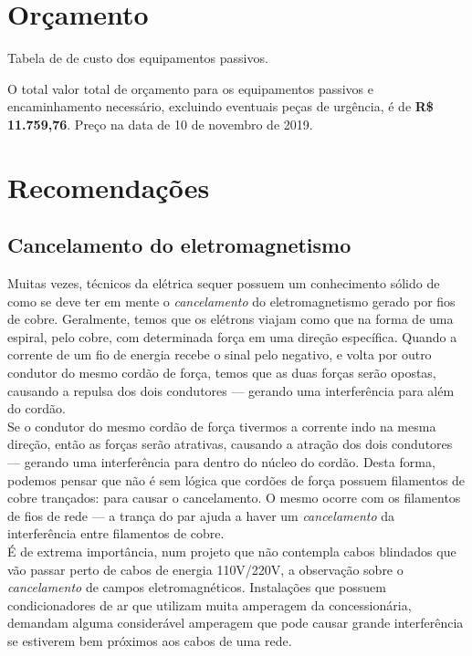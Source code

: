 \documentclass[	DIV=calc,%
							paper=a4,%
							fontsize=12pt,%
							onecolumn]{scrartcl}	 					%
\begin{document}
\pagebreak

\section{Orçamento}
Tabela de de custo dos equipamentos passivos.
\vspace{0.5cm}











O total valor total de orçamento para os equipamentos passivos e encaminhamento necessário, excluindo eventuais peças de urgência, é de \textbf{R\$ 11.759,76}.
Preço na data de 10 de novembro de 2019.

\pagebreak

\section{Recomendações}

\subsection{Cancelamento do eletromagnetismo}

Muitas vezes, técnicos da elétrica sequer possuem um conhecimento sólido de como se deve ter em mente o \textit{cancelamento} do eletromagnetismo gerado por fios de cobre. Geralmente, temos que os elétrons viajam como que na forma de uma espiral, pelo cobre, com determinada força em uma direção específica. Quando a corrente de um fio de energia recebe o sinal pelo negativo, e volta por outro condutor do mesmo cordão de força, temos que as duas forças serão opostas, causando a repulsa dos dois condutores --- gerando uma interferência para além do cordão. 
\\

Se o condutor do mesmo cordão de força tivermos a corrente indo na mesma direção, então as forças serão atrativas, causando a atração dos dois condutores --- gerando uma interferência para dentro do núcleo do cordão. Desta forma, podemos pensar que não é sem lógica que cordões de força possuem filamentos de cobre trançados: para causar o cancelamento. O mesmo ocorre com os filamentos de fios de rede --- a trança do par ajuda a haver um \textit{cancelamento} da interferência entre filamentos de cobre.
\\

É de extrema importância, num projeto que não contempla cabos blindados  que vão passar perto de cabos de energia 110V/220V, a observação sobre o \textit{cancelamento} de campos eletromagnéticos. Instalações que possuem condicionadores de ar que utilizam muita amperagem da concessionária, demandam alguma considerável amperagem que pode causar grande interferência se estiverem bem próximos aos cabos de uma rede.  
\\
\end{document}
